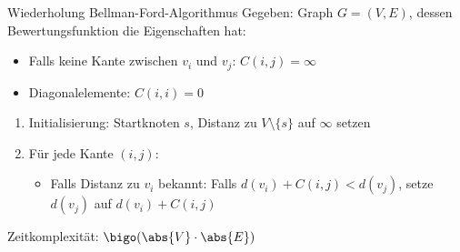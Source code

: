 \begin{algo}{Wiederholung Bellman-Ford-Algorithmus}
    Gegeben: Graph $G = (V, E)$, dessen Bewertungsfunktion die Eigenschaften hat:
    \begin{itemize}
        \item Falls keine Kante zwischen $v_i$ und $v_j$: $C(i, j) = \infty$
        \item Diagonalelemente: $C(i, i) = 0$
    \end{itemize}

    \begin{enumerate}
        \item Initialisierung: Startknoten $s$, Distanz zu $V \setminus \{s\}$ auf $\infty$ setzen
        \item Für jede Kante $(i, j)$:
              \begin{itemize}
                  \item Falls Distanz zu $v_i$ bekannt:
                        \subitem Falls $d(v_i) + C(i, j) < d(v_j)$, setze $d(v_j)$ auf $d(v_i) + C(i, j)$
              \end{itemize}
    \end{enumerate}

    Zeitkomplexität: $\bigo(\abs{V} \cdot \abs{E})$
\end{algo}

